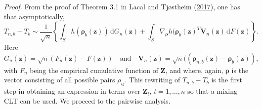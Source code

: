 \documentclass[
  12pt,
  letterpaper]{article}
\numberwithin{equation}{section}
\newcommand{\Z}{\bm{Z}}
\newcommand{\z}{\bm{z}}
\newcommand{\fV}{\bm{V}}
\newcommand{\frho}{\bm{\rho}}
\newcommand{\di}{\,\textrm{d}}
\begin{document}
\emph{Proof.} From the proof of Theorem 3.1 in Lacal and Tjøstheim (\protect\hyperlink{ref-lacal2017local}{2017}), one has that asymptotically,
\begin{equation}
T_{n,b}-T_b \sim \frac{1}{\sqrt{n}} \left\{\int_S h(\frho_b(\z)) \di G_n(\z) + \int_S\nabla_{\frho} h(\frho_b(\z)^{T} \fV_n(\z) \di F(\z)\right\}. 
\label{eq:t1}
\end{equation}
Here
\[
G_n(\z) = \sqrt{n}(F_n(\z)-F(\z)) \quad \mbox{and} \quad \fV_n(\z) = \sqrt{n}((\frho_{n,b}(\z) -\frho_b(\z)),
\]
with \(F_n\) being the empirical cumulative function of \(\Z\), and where, again, \(\frho\) is the vector consisting of all possible pairs \(\rho_{ij}\). This rewriting of \(T_{n,b}-T_b\) is the first step in obtaining an expression in terms over \(\Z_{t}\), \(t=1,\dots,n\) so that a mixing CLT can be used. We proceed to the pairwise analysis.
\end{document}
